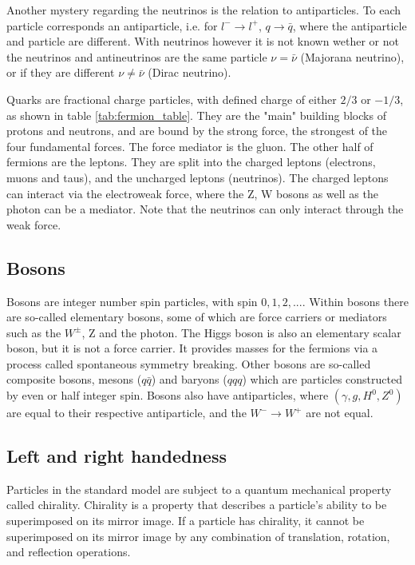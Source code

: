 Another mystery regarding the neutrinos is the relation to antiparticles. To each particle corresponds an antiparticle, i.e. for $l^-\to l^+$, $q\to \bar{q}$, where the antiparticle 
and particle are different. With neutrinos however it is not known wether or not the neutrinos and antineutrinos are the same particle $\nu = \bar{\nu}$ (Majorana neutrino), 
or if they are different $\nu \neq \bar{\nu}$ (Dirac neutrino).
\par
Quarks are fractional charge particles, with defined charge of either $2/3$ or $-1/3$, as shown in table \ref{tab:fermion_table}. They are the "main" building blocks of protons and neutrons, and are bound by the strong 
force, the strongest of the four fundamental forces. The force mediator is the gluon. The other half of fermions are the leptons. They are split into the charged 
leptons (electrons, muons and taus), and the uncharged leptons (neutrinos). The charged leptons can interact via the electroweak force, where the Z, W bosons 
as well as the photon can be a mediator. Note that the neutrinos can only interact through the weak force.

\subsection*{Bosons}
Bosons are integer number spin particles, with spin $0, 1, 2, ...$. Within bosons there are so-called elementary bosons, some of which are force carriers or mediators such as the $W^{\pm}$, Z and the photon.
The Higgs boson is also an elementary scalar boson, but it is not a force carrier. It provides masses for the fermions via a process called spontaneous symmetry breaking\cite{Pich:819632}. Other 
bosons are so-called composite bosons, mesons ($q\bar{q}$) and baryons ($qqq$) which are particles constructed by even or half integer spin. Bosons also have antiparticles, where $(\gamma, g, H^{0}, Z^{0})$ are
 equal to their respective antiparticle, and the $W^{-} \to W^{+}$ are not equal.

\subsection*{Left and right handedness}
Particles in the standard model are subject to a quantum mechanical property called chirality. 
Chirality is a property that describes a particle's ability to be superimposed on its mirror image. 
If a particle has chirality, it cannot be superimposed on its mirror image by any combination of translation, 
rotation, and reflection operations. \cite{weinberg_1995}

